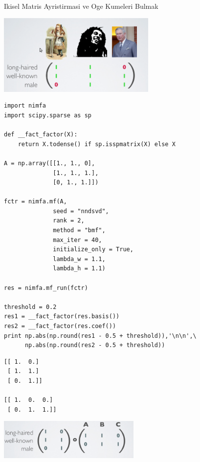 \documentclass[12pt,fleqn]{article}\usepackage{../common}
\begin{document}
Ikisel Matris Ayristirmasi ve Oge Kumeleri Bulmak

\includegraphics[height=4cm]{abc.png}

\begin{verbatim}
import nimfa
import scipy.sparse as sp

def __fact_factor(X):
    return X.todense() if sp.isspmatrix(X) else X

A = np.array([[1., 1., 0],
              [1., 1., 1.],
              [0, 1., 1.]])

fctr = nimfa.mf(A,
              seed = "nndsvd", 
              rank = 2, 
              method = "bmf", 
              max_iter = 40, 
              initialize_only = True,
              lambda_w = 1.1,
              lambda_h = 1.1)

res = nimfa.mf_run(fctr)

threshold = 0.2
res1 = __fact_factor(res.basis())
res2 = __fact_factor(res.coef())
print np.abs(np.round(res1 - 0.5 + threshold)),'\n\n',\
      np.abs(np.round(res2 - 0.5 + threshold))
\end{verbatim}

\begin{verbatim}
[[ 1.  0.]
 [ 1.  1.]
 [ 0.  1.]] 

[[ 1.  0.  0.]
 [ 0.  1.  1.]]
\end{verbatim}

\includegraphics[height=2cm]{abc_res.png}
\end{document}
